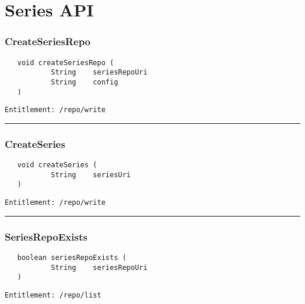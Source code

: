 \chapter{Series API}

\subsection{CreateSeriesRepo}
\label{Api:CreateSeriesRepo}
\begin{verbatim}
   void createSeriesRepo (
           String    seriesRepoUri
           String    config
   )
\end{verbatim}
\begin{Verbatim}[fontsize=\small, formatcom=\color{Maroon}]
  Entitlement: /repo/write
\end{Verbatim}



\rule{12cm}{2pt}
\subsection{CreateSeries}
\label{Api:CreateSeries}
\begin{verbatim}
   void createSeries (
           String    seriesUri
   )
\end{verbatim}
\begin{Verbatim}[fontsize=\small, formatcom=\color{Maroon}]
  Entitlement: /repo/write
\end{Verbatim}



\rule{12cm}{2pt}
\subsection{SeriesRepoExists}
\label{Api:SeriesRepoExists}
\begin{verbatim}
   boolean seriesRepoExists (
           String    seriesRepoUri
   )
\end{verbatim}
\begin{Verbatim}[fontsize=\small, formatcom=\color{Maroon}]
  Entitlement: /repo/list
\end{Verbatim}



